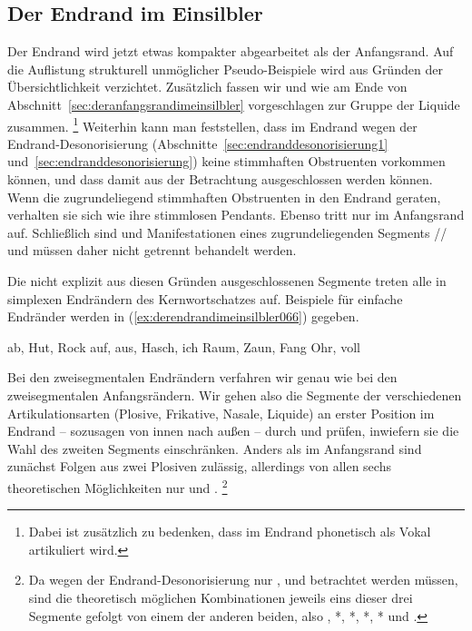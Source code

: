 \subsection{Der Endrand im Einsilbler}
\label{sec:derendrandimeinsilbler}

Der Endrand wird jetzt etwas kompakter abgearbeitet als der Anfangsrand.
Auf die Auflistung strukturell unmöglicher Pseudo-Beispiele wird aus Gründen der Übersichtlichkeit verzichtet.
Zusätzlich fassen wir \textipa{[l]} und \textipa{[K]} wie am Ende von Abschnitt~\ref{sec:deranfangsrandimeinsilbler} vorgeschlagen zur Gruppe der Liquide zusammen.%
\footnote{Dabei ist zusätzlich zu bedenken, dass \textipa{[K]} im Endrand phonetisch als Vokal artikuliert wird.}
Weiterhin kann man feststellen, dass im Endrand wegen der Endrand-Desonorisierung (Abschnitte~\ref{sec:endranddesonorisierung1} und~\ref{sec:endranddesonorisierung}) keine stimmhaften Obstruenten vorkommen können, und dass damit \textipa{[b d g v z J]} aus der Betrachtung ausgeschlossen werden können.
Wenn die zugrundeliegend stimmhaften Obstruenten in den Endrand geraten, verhalten sie sich wie ihre stimmlosen Pendants.
Ebenso tritt \textipa{[h]} nur im Anfangsrand auf.
Schließlich sind \textipa{[\c{c}]} und \textipa{[X]} Manifestationen eines zugrundeliegenden Segments // und müssen daher nicht getrennt behandelt werden.

Die nicht explizit aus diesen Gründen ausgeschlossenen Segmente treten alle in simplexen Endrändern des Kernwortschatzes auf.
Beispiele für einfache Endränder werden in (\ref{ex:derendrandimeinsilbler066}) gegeben.

\begin{exe}
  \ex\label{ex:derendrandimeinsilbler066}
  \begin{xlist}
    \ex ab, Hut, Rock
    \ex auf, aus, Hasch, ich
    \ex Raum, Zaun, Fang
    \ex Ohr, voll
  \end{xlist}
\end{exe}

Bei den zweisegmentalen Endrändern verfahren wir genau wie bei den zweisegmentalen Anfangsrändern.
Wir gehen also die Segmente der verschiedenen Artikulationsarten (Plosive, Frikative, Nasale, Liquide) an erster Position im Endrand -- sozusagen von innen nach außen -- durch und prüfen, inwiefern sie die Wahl des zweiten Segments einschränken.
Anders als im Anfangsrand sind zunächst Folgen aus zwei Plosiven zulässig, allerdings von allen sechs theoretischen Möglichkeiten nur \textipa{[pt]} und \textipa{[kt]}.%
\footnote{Da wegen der Endrand-Desonorisierung nur \textipa{[k]}, \textipa{[t]} und \textipa{[p]} betrachtet werden müssen, sind die theoretisch möglichen Kombinationen jeweils eins dieser drei Segmente gefolgt von einem der anderen beiden, also \textipa{[kt]}, *\textipa{[kp]}, *\textipa{[tk]}, *\textipa{[tp]}, *\textipa{[pk]} und \textipa{[pt]}.}

